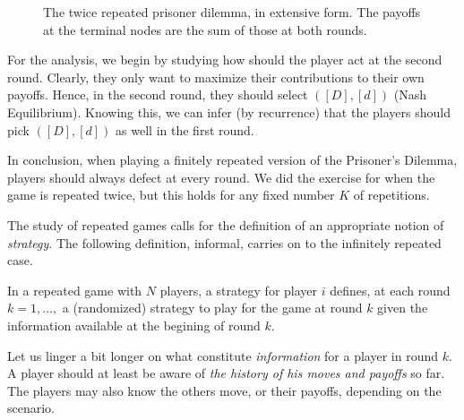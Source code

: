 \begin{example}
\begin{figure}[!ht]
\caption{The twice repeated prisoner dilemma, in extensive form. The payoffs at the terminal nodes are the sum of those at both rounds. }
\label{fig:2PDtree}
\end{figure}

For the analysis, we begin by studying how should the player act at the second round. Clearly, they only want to maximize their contributions to their own payoffs. Hence, in the second round, they should select $([D],[d])$ (Nash Equilibrium).
Knowing this, we can infer (by recurrence) that the players should pick $([D],[d])$ as well in the first round.

In conclusion, when playing a finitely repeated version of the Prisoner's Dilemma, players should always defect at every round.
We did the exercise for when the game is repeated twice, but this holds for any fixed number $K$ of repetitions.
\end{example}

The study of repeated games calls for the definition of an appropriate notion of \emph{strategy}. The following definition, informal, carries on to the infinitely repeated case.
\begin{definition}
In a repeated game with $N$ players, a strategy for player $i$ defines, at each round $k = 1, \ldots, $ a (randomized) strategy to play for the game at round $k$ given the information available at the begining of round $k$.
\end{definition}

Let us linger a bit longer on what constitute \emph{information} for a player in round $k$. A player should at least be aware of \emph{the history of his moves and payoffs} so far.
The players may also know the others move, or their payoffs, depending on the scenario.


